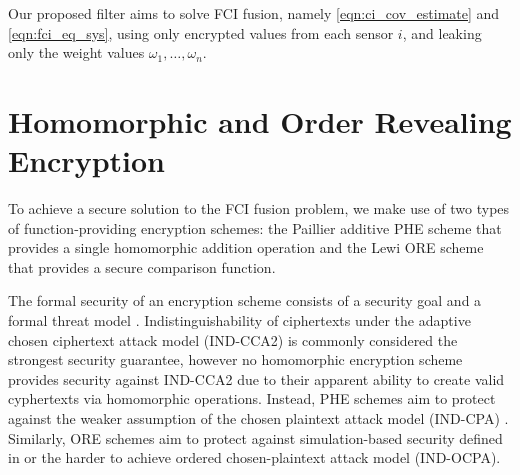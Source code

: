 \documentclass[letterpaper, 10 pt, conference]{ieeeconf}  %
\begin{document}
Our proposed filter aims to solve FCI fusion, namely \eqref{eqn:ci_cov_estimate} and \eqref{eqn:fci_eq_sys}, using only encrypted values from each sensor $i$, and leaking only the weight values $\omega_1,\dots,\omega_n$.




\section{Homomorphic and Order Revealing Encryption} \label{sec:encryption}
To achieve a secure solution to the FCI fusion problem, we make use of two types of function-providing encryption schemes: the Paillier additive PHE scheme \cite{paillierPublicKeyCryptosystemsBased1999} that provides a single homomorphic addition operation and the Lewi ORE scheme \cite{lewiOrderRevealingEncryptionNew2016} that provides a secure comparison function.

The formal security of an encryption scheme consists of a security goal and a formal threat model \cite{katzIntroductionModernCryptography2008}. Indistinguishability of ciphertexts under the adaptive chosen ciphertext attack model (IND-CCA2) is commonly considered the strongest security guarantee, however no homomorphic encryption scheme provides security against IND-CCA2 due to their apparent ability to create valid cyphertexts via homomorphic operations. Instead, PHE schemes aim to protect against the weaker assumption of the chosen plaintext attack model (IND-CPA) \cite{chaseSecurityHomomorphicEncryption2017}. Similarly, ORE schemes aim to protect against simulation-based security defined in \cite{chenettePracticalOrderRevealingEncryption2016} or the harder to achieve ordered chosen-plaintext attack model (IND-OCPA).
\end{document}
